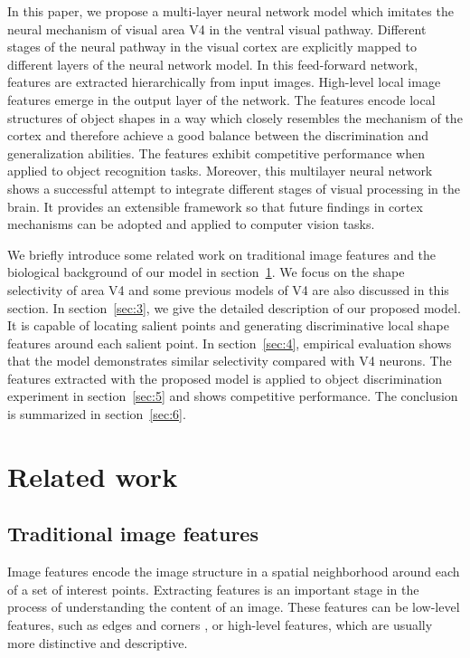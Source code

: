 \documentclass[10pt]{article}
\begin{document}
In this paper, we propose a multi-layer neural network model
which imitates the neural mechanism of visual area V4 in the ventral visual pathway.
Different stages of the neural pathway in the visual cortex
are explicitly mapped to different layers of the neural network model.
In this feed-forward network, features are extracted hierarchically from input images. 
High-level local image features emerge in the output layer of the network. 
The features encode local structures of object shapes in a way which closely resembles the mechanism of the cortex 
and therefore achieve a good balance between the discrimination and generalization abilities.
The features exhibit competitive performance when applied to object recognition tasks.
Moreover, this multilayer neural network shows a successful attempt 
to integrate different stages of visual processing in the brain. 
It provides an extensible framework so that future findings in cortex mechanisms 
can be adopted and applied to computer vision tasks.

We briefly introduce some related work on traditional image features
and the biological background of our model in section~\ref{sec:2}.
We focus on the shape selectivity of area V4 and some previous models of V4 are also discussed in this section.
In section~\ref{sec:3}, we give the detailed description of our proposed model.
It is capable of locating salient points 
and generating discriminative local shape features around each salient point.
In section~\ref{sec:4}, empirical evaluation shows that
the model demonstrates similar selectivity compared with V4 neurons.
The features extracted with the proposed model is 
applied to object discrimination experiment in section~\ref{sec:5}
and shows competitive performance.
The conclusion is summarized in section~\ref{sec:6}.

\section{Related work}\label{sec:2}

\subsection{Traditional image features}

Image features encode the image structure in a spatial neighborhood around each of a set of interest points.
Extracting features is an important stage in the process of understanding the content of an image.
These features can be low-level features, such as edges \cite{canny1986} 
and corners \cite{harris1988,smith1997},
or high-level features, which are usually more distinctive and descriptive.
\end{document}
